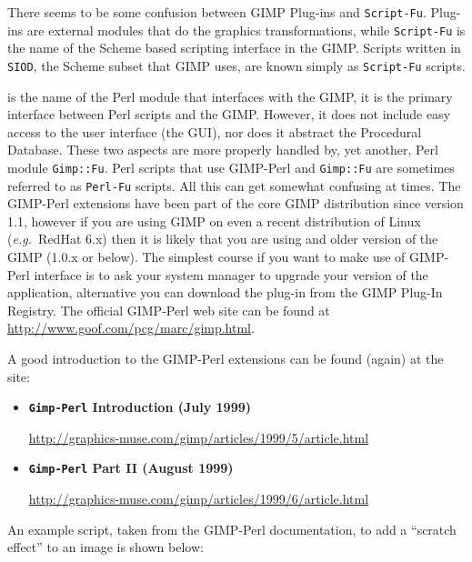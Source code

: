 \documentclass[twoside,11pt]{starlink}
\begin{document}
There seems to be some confusion between GIMP Plug-ins and \texttt{Script-Fu}.  Plug-ins are external modules that do the graphics
transformations, while \texttt{Script-Fu} is the name of the Scheme based
scripting interface in the GIMP.  Scripts written in \texttt{SIOD}, the
Scheme subset that GIMP uses, are known simply as \texttt{Script-Fu}
scripts.

is the name of the Perl module that interfaces with the GIMP, it is
the primary interface between Perl scripts and the GIMP. However, it
does not include easy access to the user interface (the GUI), nor does
it abstract the Procedural Database. These two aspects are more
properly handled by, yet another, Perl module \texttt{Gimp::Fu}. Perl
scripts that use GIMP-Perl and \texttt{Gimp::Fu} are sometimes referred
to as \texttt{Perl-Fu} scripts. All this can get somewhat confusing at
times. The GIMP-Perl extensions have been part of the core GIMP
distribution since version 1.1, however if you are using GIMP on even
a recent distribution of Linux (\emph{e.g.\ }RedHat 6.x) then it is
likely that you are using and older version of the GIMP (1.0.x or
below). The simplest course if you want to make use of GIMP-Perl
interface is to ask your system manager to upgrade your version of the
application, alternative you can download the plug-in from the GIMP
Plug-In Registry. The official GIMP-Perl web site can be found
at \url{http://www.goof.com/pcg/marc/gimp.html}.

A good introduction to the GIMP-Perl extensions can be found (again)
at the  site:

\begin{itemize}
\item {\bf\texttt{Gimp-Perl} Introduction (July 1999)}\\
\begin{small}\url{http://graphics-muse.com/gimp/articles/1999/5/article.html}\end{small}
\item {\bf\texttt{Gimp-Perl} Part II (August 1999)}\\
\begin{small}\url{http://graphics-muse.com/gimp/articles/1999/6/article.html}\end{small}
\end{itemize}

An example script, taken from the GIMP-Perl documentation, to add a
``scratch effect'' to an image is shown below:
\end{document}
